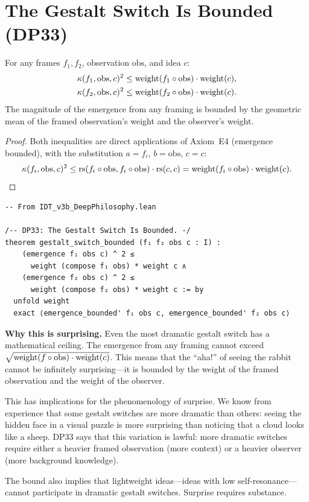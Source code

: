 \section{The Gestalt Switch Is Bounded (DP33)}

\begin{theorem}
\label{thm:gestalt-switch-bounded}
For any frames $f_1, f_2$, observation $\mathrm{obs}$, and idea $c$:
\begin{align}
\kappa(f_1, \mathrm{obs}, c)^2 &\leq
\mathrm{weight}(f_1 \circ \mathrm{obs}) \cdot \mathrm{weight}(c), \\
\kappa(f_2, \mathrm{obs}, c)^2 &\leq
\mathrm{weight}(f_2 \circ \mathrm{obs}) \cdot \mathrm{weight}(c).
\end{align}
The magnitude of the emergence from any framing is bounded by the
geometric mean of the framed observation's weight and the observer's weight.
\end{theorem}

\begin{proof}
Both inequalities are direct applications of Axiom~E4
(emergence bounded), with the substitution $a = f_i$, $b = \mathrm{obs}$,
$c = c$:
\[
\kappa(f_i, \mathrm{obs}, c)^2 \leq
\mathrm{rs}(f_i \circ \mathrm{obs}, f_i \circ \mathrm{obs}) \cdot
\mathrm{rs}(c, c) = \mathrm{weight}(f_i \circ \mathrm{obs}) \cdot
\mathrm{weight}(c).
\]
\end{proof}

\begin{lstlisting}
-- From IDT_v3b_DeepPhilosophy.lean

/-- DP33: The Gestalt Switch Is Bounded. -/
theorem gestalt_switch_bounded (f₁ f₂ obs c : I) :
    (emergence f₁ obs c) ^ 2 ≤
      weight (compose f₁ obs) * weight c ∧
    (emergence f₂ obs c) ^ 2 ≤
      weight (compose f₂ obs) * weight c := by
  unfold weight
  exact ⟨emergence_bounded' f₁ obs c, emergence_bounded' f₂ obs c⟩
\end{lstlisting}

\begin{surprisebox}
\noindent\textbf{Why this is surprising.}
Even the most dramatic gestalt switch has a mathematical ceiling.
The emergence from any framing cannot exceed
$\sqrt{\mathrm{weight}(f \circ \mathrm{obs}) \cdot \mathrm{weight}(c)}$.
This means that the ``aha!'' of seeing the rabbit cannot be
infinitely surprising---it is bounded by the weight of the
framed observation and the weight of the observer.

This has implications for the phenomenology of surprise.  We know
from experience that some gestalt switches are more dramatic than
others: seeing the hidden face in a visual puzzle is more surprising
than noticing that a cloud looks like a sheep.  DP33 says that this
variation is lawful: more dramatic switches require either a heavier
framed observation (more context) or a heavier observer (more
background knowledge).

The bound also implies that lightweight ideas---ideas with low
self-resonance---cannot participate in dramatic gestalt switches.
Surprise requires substance.
\end{surprisebox}

